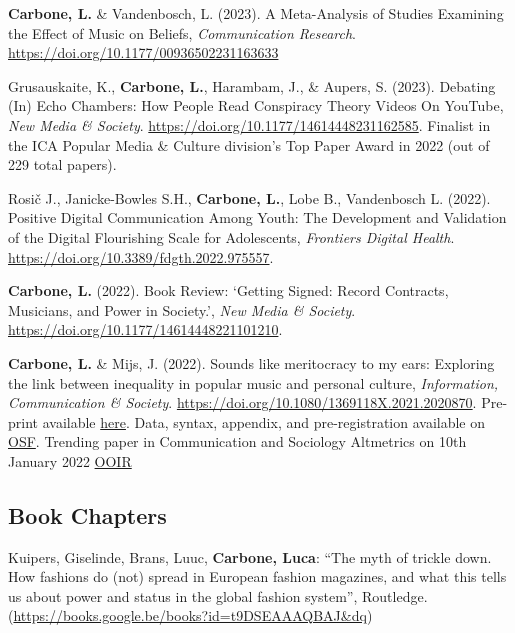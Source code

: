 \documentclass[12pt,]{article}
\begin{document}
\textbf{Carbone, L.} \& Vandenbosch, L. (2023). A Meta-Analysis of
Studies Examining the Effect of Music on Beliefs, \emph{Communication
Research}. \url{https://doi.org/10.1177/00936502231163633} \newline

Grusauskaite, K., \textbf{Carbone, L.}, Harambam, J., \& Aupers, S.
(2023). Debating (In) Echo Chambers: How People Read Conspiracy Theory
Videos On YouTube, \emph{New Media \& Society}.
\url{https://doi.org/10.1177/14614448231162585}. Finalist in the ICA
Popular Media \& Culture division's Top Paper Award in 2022 (out of 229
total papers). \newline

Rosič J., Janicke-Bowles S.H., \textbf{Carbone, L.}, Lobe B.,
Vandenbosch L. (2022). Positive Digital Communication Among Youth: The
Development and Validation of the Digital Flourishing Scale for
Adolescents, \emph{Frontiers Digital Health}.
\url{https://doi.org/10.3389/fdgth.2022.975557}. \newline

\textbf{Carbone, L.} (2022). Book Review: `Getting Signed: Record
Contracts, Musicians, and Power in Society.', \emph{New Media \&
Society}. \url{https://doi.org/10.1177/14614448221101210}. \newline

\textbf{Carbone, L.} \& Mijs, J. (2022). Sounds like meritocracy to my
ears: Exploring the link between inequality in popular music and
personal culture, \emph{Information, Communication \& Society}.
\url{https://doi.org/10.1080/1369118X.2021.2020870}. Pre-print available
\href{https://t.co/znOwdcxRO2?amp=1}{here}. Data, syntax, appendix, and
pre-registration available on \href{https://osf.io/5427t/}{OSF}.
Trending paper in Communication and Sociology Altmetrics on 10th January
2022 \href{https://t.co/6jLlFffvFT}{OOIR} \newline

\hypertarget{book-chapters}{%
\subsection{Book Chapters}\label{book-chapters}}

Kuipers, Giselinde, Brans, Luuc, \textbf{Carbone, Luca}: ``The myth of
trickle down. How fashions do (not) spread in European fashion
magazines, and what this tells us about power and status in the global
fashion system'', Routledge.
(\url{https://books.google.be/books?id=t9DSEAAAQBAJ\&dq}) \newline
\end{document}
